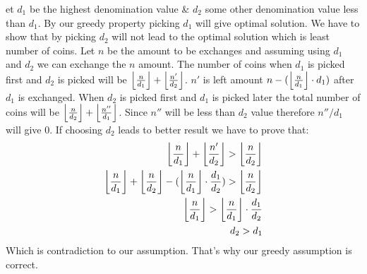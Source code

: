 \documentclass[a4paper,11pt]{article}
\DeclarePairedDelimiter\floor{\lfloor}{\rfloor}
\theoremstyle{quest}
\newenvironment{solution}[2][Solution]{\begin{trivlist}
		\item[\hskip \labelsep {\bfseries #1}\hskip \labelsep {\bfseries #2.}]}{\end{trivlist}}
\begin{document}
\begin{solution}
		Let $d_1$ be the highest denomination value \& $d_2$ some other denomination value less than $d_1$. By our greedy property picking $d_1$ will give optimal solution. We have to show that by picking $d_2$ will not lead to the optimal solution which is least number of coins. Let $n$ be the amount to be exchanges and assuming using $d_1$ and $d_2$ we can exchange the $n$ amount.
		The number of coins when $d_1$ is picked first and $d_2$ is picked will be $\floor*{\frac{n}{d_1}} + \floor*{\frac{n'}{d_2}}$. $n'$ is left amount $n - (\floor*{\frac{n}{d_1}}\cdot d_1)$ after $d_1$ is exchanged. When $d_2$ is picked first and $d_1$ is picked later the total number of coins will be $\floor*{\frac{n}{d_2}} + \floor*{\frac{n''}{d_1}}$. Since $n''$ will be less than $d_2$ value therefore $n''/d_1$ will give 0. If choosing $d_2$ leads to better result we have to prove that:
		\begin{align*}
		\floor*{\frac{n}{d_1}} + \floor*{\frac{n'}{d_2}} > \floor*{\frac{n}{d_2}}\\
		\floor*{\frac{n}{d_1}} + \floor*{\frac{n}{d_2}} - (\floor*{\frac{n}{d_1}} \cdot \frac{d_1}{d_2}) > \floor*{\frac{n}{d_2}}\\
		\floor*{\frac{n}{d_1}} > \floor*{\frac{n}{d_1}} \cdot \frac{d_1}{d_2} \\
		d_2 > d_1
		\end{align*}
		Which is contradiction to our assumption. That's why our greedy assumption is correct.\\
		

\end{solution}
\end{document}
